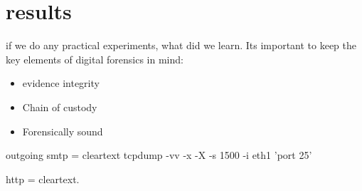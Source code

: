 \section{results}
if we do any practical experiments, what did we learn.
Its important to keep the key elements of digital forensics in mind:
\begin{itemize}
\item evidence integrity
\item Chain of custody
\item Forensically sound
\end{itemize}

outgoing smtp = cleartext
tcpdump -vv -x -X -s 1500 -i eth1 'port 25'

http = cleartext.

